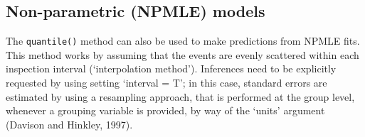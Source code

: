 \documentclass[
]{book}
\newenvironment{Shaded}{\begin{snugshade}}{\end{snugshade}}
\newcommand{\DocumentationTok}[1]{\textcolor[rgb]{0.56,0.35,0.01}{\textbf{\textit{#1}}}}
\begin{document}
\begin{Shaded}
\end{Shaded}

\hypertarget{non-parametric-npmle-models}{%
\subsection{Non-parametric (NPMLE) models}\label{non-parametric-npmle-models}}

The \texttt{quantile()} method can also be used to make predictions from NPMLE fits. This method works by assuming that the events are evenly scattered within each inspection interval (`interpolation method'). Inferences need to be explicitly requested by using setting `interval = T'; in this case, standard errors are estimated by using a resampling approach, that is performed at the group level, whenever a grouping variable is provided, by way of the `units' argument (Davison and Hinkley, 1997).
\end{document}
